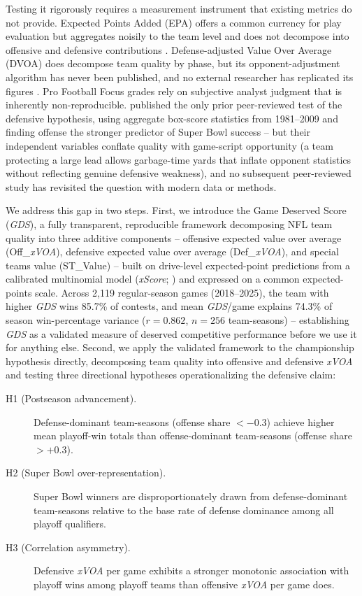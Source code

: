 \documentclass[12pt,a4paper]{article}
\newcommand{\xscore}{\textit{xScore}}
\newcommand{\xvoa}{\textit{xVOA}}
\newcommand{\gds}{\textit{GDS}}
\begin{document}
Testing it rigorously requires a measurement instrument that existing metrics do not provide. Expected Points Added (EPA) offers a common currency for play evaluation but aggregates noisily to the team level and does not decompose into offensive and defensive contributions \citep{carl2021nflfastr}. Defense-adjusted Value Over Average (DVOA) does decompose team quality by phase, but its opponent-adjustment algorithm has never been published, and no external researcher has replicated its figures \citep{schatz2005dvoa}. Pro Football Focus grades rely on subjective analyst judgment that is inherently non-reproducible. \citet{robst2011defense} published the only prior peer-reviewed test of the defensive hypothesis, using aggregate box-score statistics from 1981--2009 and finding offense the stronger predictor of Super Bowl success -- but their independent variables conflate quality with game-script opportunity (a team protecting a large lead allows garbage-time yards that inflate opponent statistics without reflecting genuine defensive weakness), and no subsequent peer-reviewed study has revisited the question with modern data or methods.

We address this gap in two steps. First, we introduce the Game Deserved Score (\gds{}), a fully transparent, reproducible framework decomposing NFL team quality into three additive components -- offensive expected value over average (Off\_\xvoa{}), defensive expected value over average (Def\_\xvoa{}), and special teams value (ST\_Value) -- built on drive-level expected-point predictions from a calibrated multinomial model (\xscore{}; \citealt{mecha2026xscore-model}) and expressed on a common expected-points scale. Across 2,119 regular-season games (2018--2025), the team with higher \gds{} wins 85.7\% of contests, and mean \gds{}/game explains 74.3\% of season win-percentage variance ($r=0.862$, $n=256$ team-seasons) -- establishing \gds{} as a validated measure of deserved competitive performance before we use it for anything else. Second, we apply the validated framework to the championship hypothesis directly, decomposing team quality into offensive and defensive \xvoa{} and testing three directional hypotheses operationalizing the defensive claim:

\begin{description}
  \item[H1 (Postseason advancement).] Defense-dominant team-seasons (offense share $< -0.3$) achieve higher mean playoff-win totals than offense-dominant team-seasons (offense share $> +0.3$).
  \item[H2 (Super Bowl over-representation).] Super Bowl winners are disproportionately drawn from defense-dominant team-seasons relative to the base rate of defense dominance among all playoff qualifiers.
  \item[H3 (Correlation asymmetry).] Defensive \xvoa{} per game exhibits a stronger monotonic association with playoff wins among playoff teams than offensive \xvoa{} per game does.
\end{description}
\end{document}
